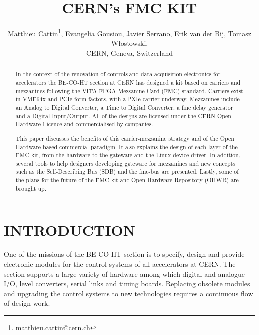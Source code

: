 \documentclass{JAC2003}
\begin{document}
\title{CERN's FMC KIT}

\author{Matthieu Cattin\thanks{matthieu.cattin@cern.ch}, Evangelia Gousiou, Javier Serrano, Erik van der Bij, Tomasz W\l{}ostowski,\\
CERN, Geneva, Switzerland}

\maketitle

\begin{abstract}
  In the context of the renovation of controls and data acquisition electronics for accelerators the BE-CO-HT section at CERN has designed a kit based on carriers and mezzanines following the VITA FPGA Mezzanine Card (FMC) standard. Carriers exist in VME64x and PCIe form factors, with a PXIe carrier underway. Mezzanines include an Analog to Digital Converter, a Time to Digital Converter, a fine delay generator and a Digital Input/Output. All of the designs are licensed under the CERN Open Hardware Licence and commercialised by companies.

This paper discusses the benefits of this carrier-mezzanine strategy and of the Open Hardware based commercial paradigm.
It also explains the design of each layer of the FMC kit, from the hardware to the gateware and the Linux device driver.
In addition, several tools to help designers developing gateware for mezzanines and new concepts such as the Self-Describing Bus (SDB) and the fmc-bus are presented.
Lastly, some of the plans for the future of the FMC kit and Open Hardware Repository (OHWR) are brought up.
\end{abstract}

\section{INTRODUCTION}
One of the missions of the BE-CO-HT section is to specify, design and provide electronic modules for the control systems of all accelerators at CERN.
The section supports a large variety of hardware among which digital and analogue I/O, level converters, serial links and timing boards.
Replacing obsolete modules and upgrading the control systems to new technologies requires a continuous flow of design work.
\end{document}
